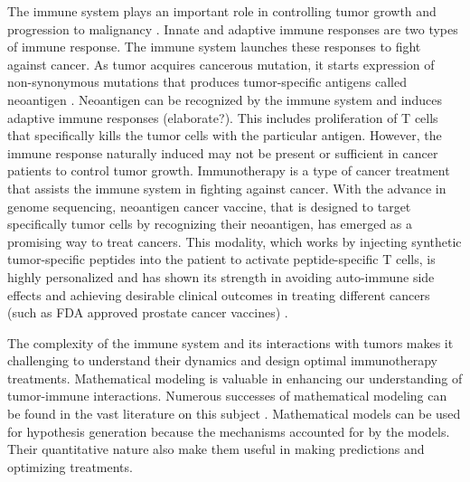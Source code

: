 \documentclass[review,authoryear]{elsarticle}
\begin{document}
The immune system plays an important role in controlling tumor growth
and progression to malignancy \citep{Waldman2020}. Innate and adaptive
immune responses are two types of immune response. The immune system
launches these responses to fight against cancer. As tumor acquires
cancerous mutation, it starts expression of non-synonymous mutations
that produces tumor-specific antigens called neoantigen \citep{Peng2019}.
Neoantigen can be recognized by the immune system and induces adaptive
immune responses (elaborate?). This includes proliferation of T cells
that specifically kills the tumor cells with the particular antigen.
However, the immune response naturally induced may not be present
or sufficient in cancer patients to control tumor growth. Immunotherapy
is a type of cancer treatment that assists the immune system in fighting
against cancer. With the advance in genome sequencing, neoantigen
cancer vaccine, that is designed to target specifically tumor cells
by recognizing their neoantigen, has emerged as a promising way to
treat cancers. This modality, which works by injecting synthetic tumor-specific
peptides into the patient to activate peptide-specific T cells, is
highly personalized and has shown its strength in avoiding auto-immune
side effects \citep{Nelde2021} and achieving desirable clinical outcomes in
treating different cancers (such as FDA approved prostate cancer vaccines)
\citep[e.g.][]{Ott2017,Pan2018,Peng2019}. 

The complexity of the immune system and its interactions with tumors
makes it challenging to understand their dynamics and design optimal
immunotherapy treatments. Mathematical modeling is valuable in enhancing
our understanding of tumor-immune interactions. Numerous successes
of mathematical modeling can be found in the vast literature on this
subject \citep[e.g. see reviews by][and references therein]{Eftimie2016,Mahlbacher2019,Nukala2021}. Mathematical models can be used for hypothesis
generation because the mechanisms accounted for by the models. Their
quantitative nature also make them useful in making predictions and
optimizing treatments. 
\end{document}
